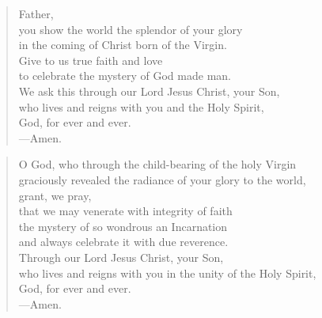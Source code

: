 \prayer

\setlength{\vleftmargin}{\prayerleftmargini}

\begin{verse}
Father,\\
you show the world the splendor of your glory\\
in the coming of Christ born of the Virgin.\\
Give to us true faith and love\\
to celebrate the mystery of God made man.\\
We ask this through our Lord Jesus Christ, your Son,\\
who lives and reigns with you and the Holy Spirit,\\
God, for ever and ever.\\
{\color{red}---\thinspace}Amen.
\end{verse}


\begin{verse}
O God, who through the child-bearing of the holy Virgin\\
graciously revealed the radiance of your glory to the world,\\
grant, we pray,\\
that we may venerate with integrity of faith\\
the mystery of so wondrous an Incarnation\\
and always celebrate it with due reverence.\\
Through our Lord Jesus Christ, your Son,\\
who lives and reigns with you in the unity of the Holy Spirit,\\
God, for ever and ever.\\
{\color{red}---\thinspace}Amen.

\end{verse}

\setlength{\vleftmargin}{\defleftmargini}